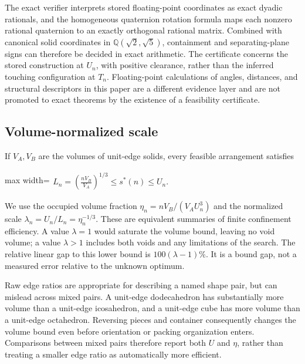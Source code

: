 \documentclass[11pt,a4paper]{article}
\begin{document}
The exact verifier interprets stored floating-point coordinates as exact dyadic rationals, and the homogeneous quaternion rotation formula maps each nonzero rational quaternion to an exactly orthogonal rational matrix. Combined with canonical solid coordinates in $\mathbb Q(\sqrt2,\sqrt5)$, containment and separating-plane signs can therefore be decided in exact arithmetic. The certificate concerns the stored construction at $U_n$, with positive clearance, rather than the inferred touching configuration at $T_n$. Floating-point calculations of angles, distances, and structural descriptors in this paper are a different evidence layer and are not promoted to exact theorems by the existence of a feasibility certificate.

\subsection{Volume-normalized scale}

If $V_A,V_B$ are the volumes of unit-edge solids, every feasible arrangement satisfies

\begin{center}\begin{adjustbox}{max width=\linewidth}$\displaystyle\begin{aligned}
L_n=\left(\frac{nV_B}{V_A}\right)^{1/3}\le s^*(n)\le U_n.
\end{aligned}$\end{adjustbox}\end{center}

We use the occupied volume fraction $\eta_n=nV_B/(V_AU_n^3)$ and the normalized scale $\lambda_n=U_n/L_n=\eta_n^{-1/3}$. These are equivalent summaries of finite confinement efficiency. A value $\lambda=1$ would saturate the volume bound, leaving no void volume; a value $\lambda>1$ includes both voids and any limitations of the search. The relative linear gap to this lower bound is $100(\lambda-1)\%$. It is a bound gap, not a measured error relative to the unknown optimum.

Raw edge ratios are appropriate for describing a named shape pair, but can mislead across mixed pairs. A unit-edge dodecahedron has substantially more volume than a unit-edge icosahedron, and a unit-edge cube has more volume than a unit-edge octahedron. Reversing pieces and container consequently changes the volume bound even before orientation or packing organization enters. Comparisons between mixed pairs therefore report both $U$ and $\eta$, rather than treating a smaller edge ratio as automatically more efficient.
\end{document}
